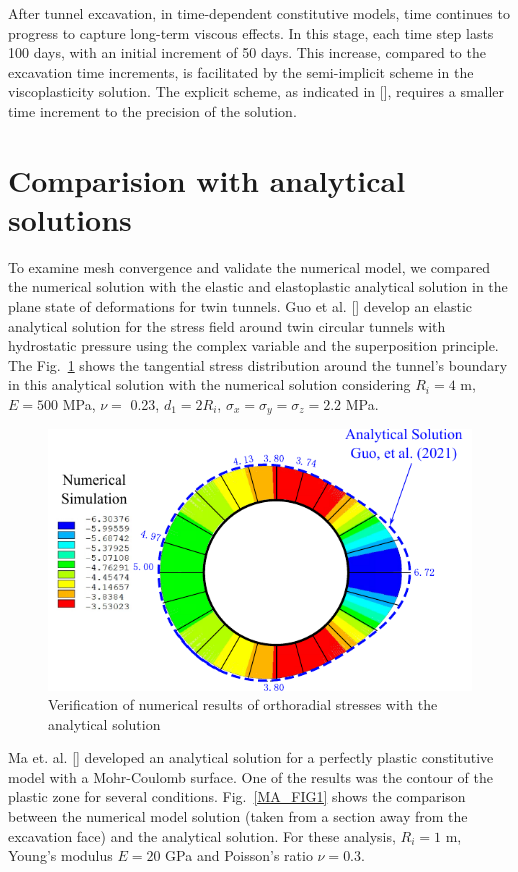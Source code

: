 \documentclass[a4paper,fleqn]{cas-sc}
\begin{document}
After tunnel excavation, in time-dependent constitutive models, time continues to progress to capture long-term viscous effects. In this stage, each time step lasts 100 days, with an initial increment of 50 days. This increase, compared to the excavation time increments, is facilitated by the semi-implicit scheme in the viscoplasticity solution. The explicit scheme, as indicated in [], requires a smaller time increment to the precision of the solution.

\section{Comparision with analytical solutions}\label{}

To examine mesh convergence and validate the numerical model, we compared the numerical solution with the elastic and elastoplastic analytical solution in the plane state of deformations for twin tunnels. Guo et al. [] develop an elastic analytical solution for the stress field around twin circular tunnels with hydrostatic pressure using the complex variable and the superposition principle. The Fig.~\ref{GUO_FIG1} shows the tangential stress distribution around the tunnel's boundary in this analytical solution with the numerical solution considering  $R_i = 4$ m, $E = 500$ MPa, $\nu =$ 0.23, $d_1 = 2R_i$, $\sigma_x = \sigma_y  = \sigma_z = 2.2$ MPa.
\begin{figure}[h!]
	\centering
	\includegraphics[scale=1]{GUO_FIG1.pdf}
	\caption{Verification of numerical results of orthoradial stresses with the analytical solution}
	\label{GUO_FIG1}
\end{figure}
\FloatBarrier
Ma et. al. [] developed an analytical solution for a perfectly plastic constitutive model with a Mohr-Coulomb surface. One of the results was the contour of the plastic zone for several conditions. Fig.~\ref{MA_FIG1} shows the comparison between the numerical model solution (taken from a section away from the excavation face) and the analytical solution. For these analysis, $R_i = 1$ m, Young's modulus $E=20$ GPa and Poisson's ratio $\nu = 0.3$.
\end{document}
